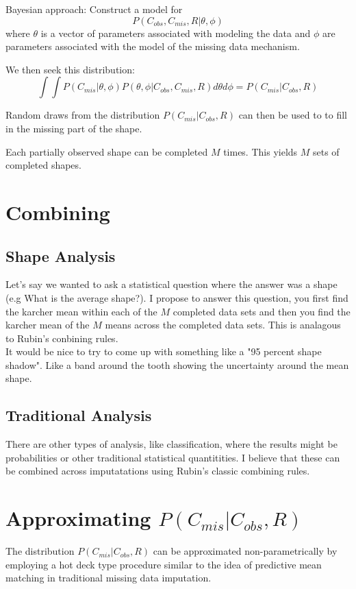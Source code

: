 \documentclass{article}\usepackage[]{graphicx}\usepackage[]{color}
\begin{document}
Bayesian approach: 
Construct a model for 
$$
P(C_{obs}, C_{mis}, R | \theta, \phi)
$$
where $\theta$ is a vector of parameters associated with modeling the data and $\phi$ are parameters associated with the model of the missing data mechanism. 

We then seek this distribution: 
$$
\int\int P(C_{mis}|\theta, \phi) P(\theta, \phi|C_{obs}, C_{mis}, R ) d\theta d\phi = P(C_{mis}|C_{obs},R)
$$

Random draws from the distribution $P(C_{mis}|C_{obs},R)$ can then be used to to fill in the missing part of the shape. 


Each partially observed shape can be completed $M$ times.  This yields $M$ sets of completed shapes.  

\section{Combining}
\subsection{Shape Analysis}
Let's say we wanted to ask a statistical question where the answer was a shape (e.g What is the average shape?).  I propose to answer this question, you first find the karcher mean within each of the $M$ completed data sets and then you find the karcher mean of the $M$ means across the completed data sets. This is analagous to Rubin's conbining rules. \\

It would be nice to try to come up with something like a "95 percent shape shadow".  Like a band around the tooth showing the uncertainty around the mean shape. \\

\subsection{Traditional Analysis}
There are other types of analysis, like classification, where the results might be probabilities or other traditional statistical quantitities.  I believe that these can be combined across imputatations using Rubin's classic combining rules.  


\section{Approximating $P(C_{mis}|C_{obs},R)$}

The distribution $P(C_{mis}|C_{obs},R)$ can be approximated non-parametrically by employing a hot deck type procedure similar to the idea of predictive mean matching in traditional missing data imputation. \\
\end{document}
